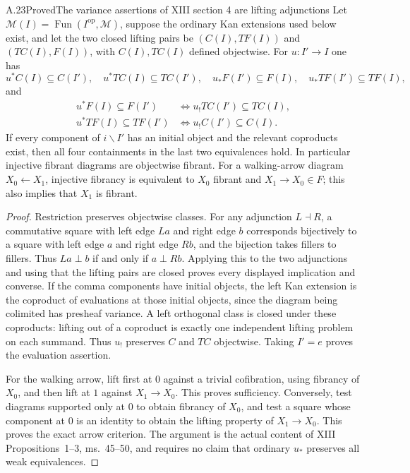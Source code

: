 \begin{claim}{A.23}{Proved}{The variance assertions of XIII section 4 are lifting adjunctions}
Let $\mathcal M(I)=\operatorname{Fun}(I^{\mathrm{op}},\mathcal M)$, suppose the ordinary Kan extensions used below exist, and let the two closed lifting pairs be $(C(I),TF(I))$ and $(TC(I),F(I))$, with $C(I),TC(I)$ defined objectwise. For $u:I'\to I$ one has
\[
u^*C(I)\subseteq C(I'),\quad u^*TC(I)\subseteq TC(I'),
\quad u_*F(I')\subseteq F(I),\quad u_*TF(I')\subseteq TF(I),
\]
and
\[
\begin{split}
u^*F(I)\subseteq F(I')&\Longleftrightarrow u_!TC(I')\subseteq TC(I),\\
u^*TF(I)\subseteq TF(I')&\Longleftrightarrow u_!C(I')\subseteq C(I).
\end{split}
\]
If every component of $i\backslash I'$ has an initial object and the relevant coproducts exist, then all four containments in the last two equivalences hold. In particular injective fibrant diagrams are objectwise fibrant. For a walking-arrow diagram $X_0\leftarrow X_1$, injective fibrancy is equivalent to $X_0$ fibrant and $X_1\to X_0\in F$; this also implies that $X_1$ is fibrant.
\end{claim}
\begin{proof}
Restriction preserves objectwise classes. For any adjunction $L\dashv R$, a commutative square with left edge $La$ and right edge $b$ corresponds bijectively to a square with left edge $a$ and right edge $Rb$, and the bijection takes fillers to fillers. Thus $La\perp b$ if and only if $a\perp Rb$. Applying this to the two adjunctions and using that the lifting pairs are closed proves every displayed implication and converse. If the comma components have initial objects, the left Kan extension is the coproduct of evaluations at those initial objects, since the diagram being colimited has presheaf variance. A left orthogonal class is closed under these coproducts: lifting out of a coproduct is exactly one independent lifting problem on each summand. Thus $u_!$ preserves $C$ and $TC$ objectwise. Taking $I'=e$ proves the evaluation assertion.

For the walking arrow, lift first at $0$ against a trivial cofibration, using fibrancy of $X_0$, and then lift at $1$ against $X_1\to X_0$. This proves sufficiency. Conversely, test diagrams supported only at $0$ to obtain fibrancy of $X_0$, and test a square whose component at $0$ is an identity to obtain the lifting property of $X_1\to X_0$. This proves the exact arrow criterion. The argument is the actual content of XIII Propositions~1--3, ms.~45--50, and requires no claim that ordinary $u_*$ preserves all weak equivalences.
\end{proof}

